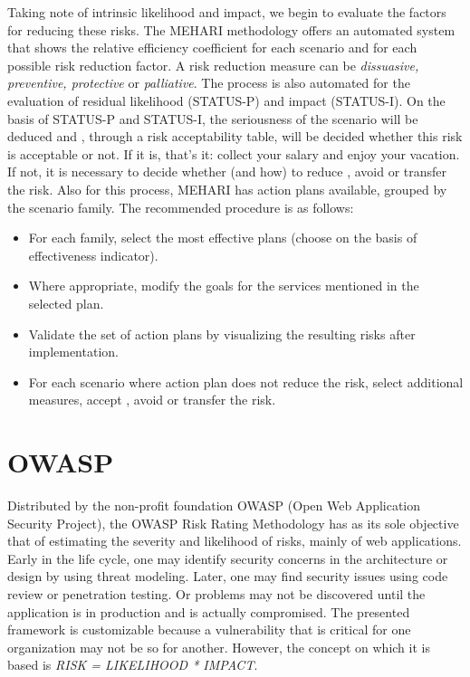 Taking note of intrinsic likelihood and impact, we begin to evaluate the factors for reducing these risks. The MEHARI methodology offers an automated system that shows the relative efficiency coefficient for each scenario and for each possible risk reduction factor. A risk reduction measure can be \textit{dissuasive, preventive, protective} or \textit{palliative}. The process is also automated for the evaluation of residual likelihood (STATUS-P) and impact (STATUS-I). On the basis of STATUS-P and STATUS-I, the seriousness of the scenario will be deduced and , through a risk acceptability table, will be decided whether this risk is acceptable or not. If it is, that's it: collect your salary and enjoy your vacation. If not, it is necessary to decide whether (and how) to reduce , avoid or transfer the risk. Also for this process, MEHARI has action plans available, grouped by the scenario family. The recommended procedure is as follows:
\begin{itemize}
    \itemsep0em
    \item For each family, select the most effective plans (choose on the basis of effectiveness indicator).
    \item Where appropriate, modify the goals for the services mentioned in the selected plan.
    \item Validate the set of action plans by visualizing the resulting risks after implementation.
    \item For each scenario where action plan does not reduce the risk, select additional measures, accept , avoid or transfer the risk.
\end{itemize}

\section{OWASP}
Distributed by the non-profit foundation OWASP (Open Web Application Security Project), the OWASP Risk Rating Methodology \cite{Williams2022} has as its sole objective that of estimating the severity and likelihood of risks, mainly of web applications. Early in the life cycle, one may identify security concerns in the architecture or design by using threat modeling. Later, one may find security issues using code review or penetration testing. Or problems may not be discovered until the application is in production and is actually compromised. The presented framework is customizable because a vulnerability that is critical for one organization may not be so for another. However, the concept on which it is based is \textit{RISK = LIKELIHOOD * IMPACT}.
